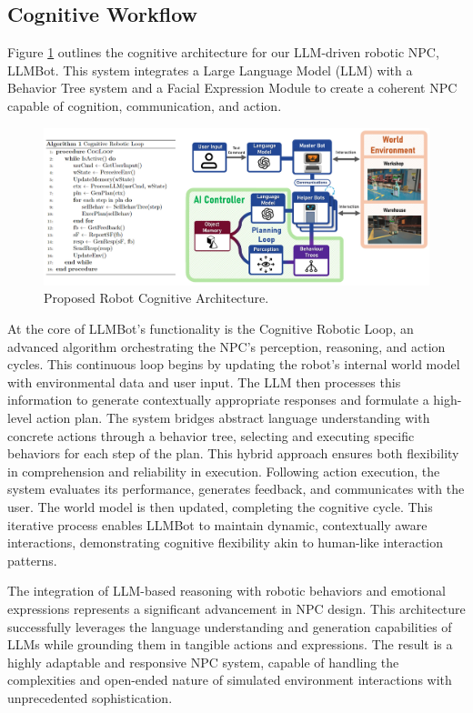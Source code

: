 \documentclass[pdflatex,sn-mathphys-num]{sn-jnl}
\theoremstyle{thmstyleone}
\theoremstyle{thmstyletwo}%
\theoremstyle{thmstylethree}%
\begin{document}
\subsection{Cognitive Workflow}

Figure \ref{cognitive_loop} outlines the cognitive architecture for our LLM-driven robotic NPC, LLMBot. This system integrates a Large Language Model (LLM) with a Behavior Tree system and a Facial Expression Module to create a coherent NPC capable of cognition, communication, and action.
\begin{figure}[H]
\centering
\includegraphics[width=1\textwidth]{figures/cognition.jpg}
\caption{Proposed Robot Cognitive Architecture.}\label{cognitive_loop}
\end{figure}

At the core of LLMBot's functionality is the Cognitive Robotic Loop, an advanced algorithm orchestrating the NPC's perception, reasoning, and action cycles. This continuous loop begins by updating the robot's internal world model with environmental data and user input. The LLM then processes this information to generate contextually appropriate responses and formulate a high-level action plan.
The system bridges abstract language understanding with concrete actions through a behavior tree, selecting and executing specific behaviors for each step of the plan. This hybrid approach ensures both flexibility in comprehension and reliability in execution.
Following action execution, the system evaluates its performance, generates feedback, and communicates with the user. The world model is then updated, completing the cognitive cycle. This iterative process enables LLMBot to maintain dynamic, contextually aware interactions, demonstrating cognitive flexibility akin to human-like interaction patterns.

The integration of LLM-based reasoning with robotic behaviors and emotional expressions represents a significant advancement in NPC design. This architecture successfully leverages the language understanding and generation capabilities of LLMs while grounding them in tangible actions and expressions. The result is a highly adaptable and responsive NPC system, capable of handling the complexities and open-ended nature of simulated environment interactions with unprecedented sophistication.
\newpage
\end{document}
